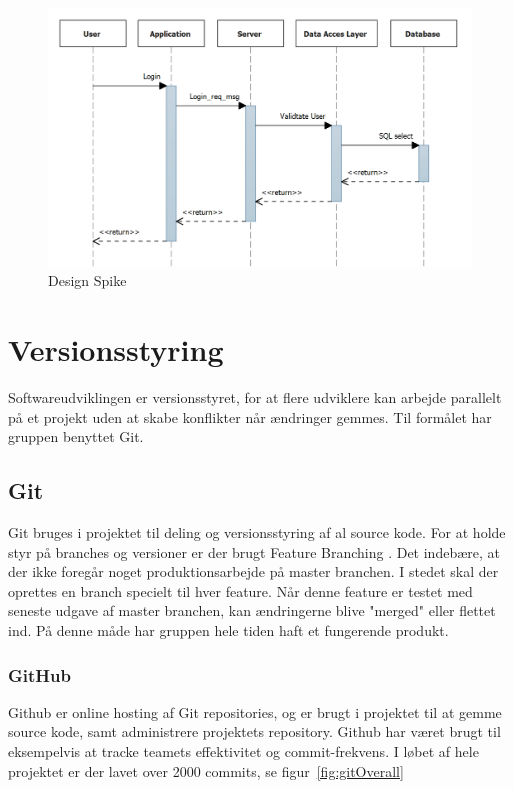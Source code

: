 \begin{figure}
	\centering
	\includegraphics[width=0.8\linewidth]{figs/processProjektGennemforsel/Spike.PNG}
	\caption{Design Spike}
	\label{fig:design_spike}
\end{figure}

\section{Versionsstyring}
Softwareudviklingen er versionsstyret, for at flere udviklere kan arbejde parallelt på et projekt uden at skabe konflikter når ændringer gemmes. Til formålet har gruppen benyttet Git.

\subsection{Git}
Git bruges i projektet til deling og versionsstyring af al source kode.
For at holde styr på branches og versioner er der brugt Feature Branching \cite{atlassian2016}. Det indebære, at der ikke foregår noget produktionsarbejde på master branchen. I stedet skal der oprettes en branch specielt til hver feature. Når denne feature er testet med seneste udgave af master branchen, kan ændringerne blive "merged" eller flettet ind. På denne måde har gruppen hele tiden haft et fungerende produkt.

\subsubsection{GitHub}
Github er online hosting af Git repositories, og er brugt i projektet til at gemme source kode, samt administrere projektets repository. Github har været brugt til eksempelvis at tracke teamets effektivitet og commit-frekvens. I løbet af hele projektet er der lavet over 2000 commits, se figur~\ref{fig:gitOverall}


